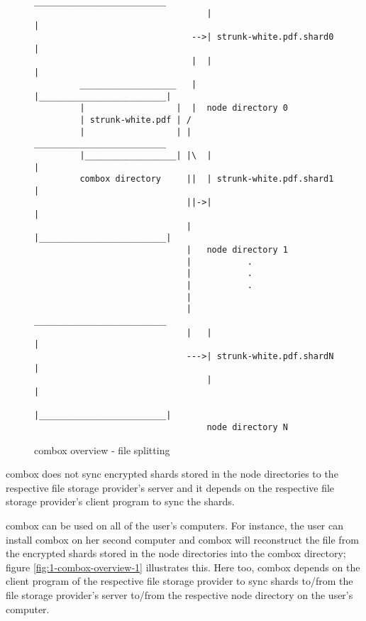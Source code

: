 \begin{figure}[h]
\begin{verbatim}

                                  __________________________
                                  |                         |
                               -->| strunk-white.pdf.shard0 |
                               |  |                         |
         ___________________   |  |_________________________|
         |                  |  |  node directory 0
         | strunk-white.pdf | /
         |                  | |   __________________________
         |__________________| |\  |                         |
         combox directory     ||  | strunk-white.pdf.shard1 |
                              ||->|                         |
                              |   |_________________________|
                              |   node directory 1
                              |           .
                              |           .
                              |           .
                              |
                              |   __________________________
                              |   |                         |
                              --->| strunk-white.pdf.shardN |
                                  |                         |
                                  |_________________________|
                                  node directory N
\end{verbatim}
\caption{combox overview - file splitting}
\label{fig:1-combox-overview-0}
\end{figure}

combox does not sync encrypted shards stored in the node directories
to the respective file storage provider's server and it depends on the
respective file storage provider's client program to sync the
shards.

combox can be used on all of the user's computers. For instance, the
user can install combox on her second computer and combox will
reconstruct the file from the encrypted shards stored in the node
directories into the combox directory; figure
\ref{fig:1-combox-overview-1} illustrates this. Here too, combox
depends on the client program of the respective file storage provider
to sync shards to/from the file storage provider's server to/from the
respective node directory on the user's computer.

